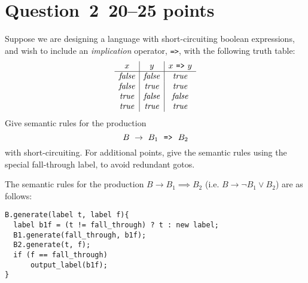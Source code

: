 \documentclass[10pt]{article}
\begin{document}
\section*{Question~2~\hfill 20--25 points}

Suppose we are designing a language with short-circuiting
boolean expressions,
and wish to include an \emph{implication} operator, \verb|=>|,
with the following truth table:
\[
  \begin{array}{c|c|c}
    x & y & x ~\verb|=>|~ y
  \\ \hline
    \mathit{false} & \mathit{false} & \mathit{true}
  \\
    \mathit{false} & \mathit{true} & \mathit{true}
  \\
    \mathit{true} & \mathit{false} & \mathit{false}
  \\
    \mathit{true} & \mathit{true} & \mathit{true}
  \end{array}
\]
Give semantic rules
for the production
\[
  B ~\rightarrow~ B_1 ~~\verb|=>|~~ B_2
\]
with short-circuiting.
For additional points,
give the semantic rules using the special fall-through label,
to avoid redundant gotos.
\begin{framed}
The semantic rules for the production $B \rightarrow B_1 \implies B_2$ (i.e. $B \rightarrow \neg B_1 \lor B_2$) are as follows:

\begin{lstlisting}[style=jvm]
B.generate(label t, label f){
  label b1f = (t != fall_through) ? t : new label;
  B1.generate(fall_through, b1f);
  B2.generate(t, f);
  if (f == fall_through)
      output_label(b1f);
}
  
\end{lstlisting}

\end{framed}

\end{document}
